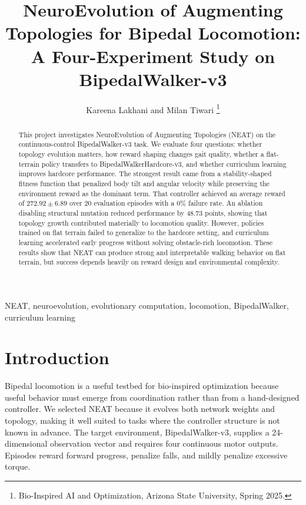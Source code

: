 \documentclass[journal]{IEEEtran}
\begin{document}
\title{NeuroEvolution of Augmenting Topologies for Bipedal Locomotion:\\
A Four-Experiment Study on BipedalWalker-v3}

\author{Kareena Lakhani and Milan Tiwari
\thanks{Bio-Inspired AI and Optimization, Arizona State University, Spring 2025.}}

\maketitle

\begin{abstract}
This project investigates NeuroEvolution of Augmenting Topologies (NEAT) on the continuous-control BipedalWalker-v3 task. We evaluate four questions: whether topology evolution matters, how reward shaping changes gait quality, whether a flat-terrain policy transfers to BipedalWalkerHardcore-v3, and whether curriculum learning improves hardcore performance. The strongest result came from a stability-shaped fitness function that penalized body tilt and angular velocity while preserving the environment reward as the dominant term. That controller achieved an average reward of $272.92 \pm 6.89$ over 20 evaluation episodes with a 0\% failure rate. An ablation disabling structural mutation reduced performance by 48.73 points, showing that topology growth contributed materially to locomotion quality. However, policies trained on flat terrain failed to generalize to the hardcore setting, and curriculum learning accelerated early progress without solving obstacle-rich locomotion. These results show that NEAT can produce strong and interpretable walking behavior on flat terrain, but success depends heavily on reward design and environmental complexity.
\end{abstract}

\begin{IEEEkeywords}
NEAT, neuroevolution, evolutionary computation, locomotion, BipedalWalker, curriculum learning
\end{IEEEkeywords}

\section{Introduction}
Bipedal locomotion is a useful testbed for bio-inspired optimization because useful behavior must emerge from coordination rather than from a hand-designed controller. We selected NEAT because it evolves both network weights and topology, making it well suited to tasks where the controller structure is not known in advance. The target environment, BipedalWalker-v3, supplies a 24-dimensional observation vector and requires four continuous motor outputs. Episodes reward forward progress, penalize falls, and mildly penalize excessive torque.
\end{document}
